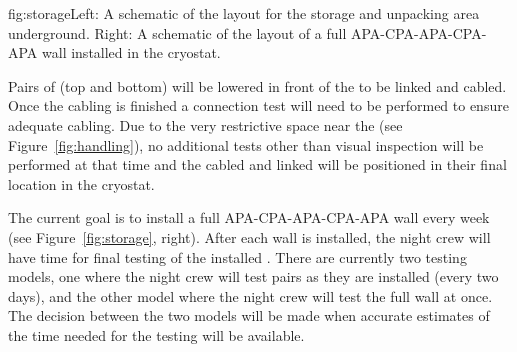 \begin{dunefigure}{fig:storage}{Left: A schematic of the layout for the storage and unpacking area underground. Right: A schematic of the layout of a full APA-CPA-APA-CPA-APA wall installed in the cryostat.}
\setlength{\fboxsep}{0pt}
\setlength{\fboxrule}{0.5pt}
\end{dunefigure}

Pairs of  (top and bottom) will be lowered in front of the  to be linked and cabled. Once the cabling is finished a connection test will need to be performed to ensure adequate cabling. Due to the very restrictive space near the  (see Figure~\ref{fig:handling}), no additional tests other than visual inspection will be performed at that time and the cabled and linked  will be positioned in their final location in the cryostat.


The current goal is to install a full APA-CPA-APA-CPA-APA wall every week (see Figure~\ref{fig:storage}, right). After each wall is installed, the night crew will have time for final testing of the installed . There are currently two testing models, one where the night crew will test  pairs as they are installed (every two days), and the other model where the night crew will test the full wall at once. The decision between the two models will be made when accurate estimates of the time needed for the testing will be available.

